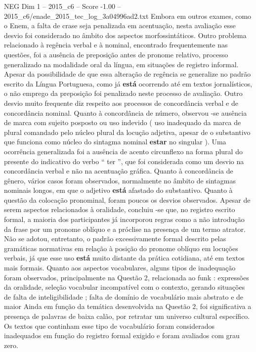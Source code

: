 \begin{textsample}{NEG Dim 1 – 2015\_c6 – Score -1.00 – 2015\_c6/enade\_2015\_tec\_log\_3a04996ad2.txt}
Embora em outros exames, como o Enem, a falta de crase seja penalizada em acentuação, nesta avaliação esse desvio foi considerado no âmbito dos aspectos morfossintáticos.
Outro problema relacionado à regência verbal e à nominal, encontrado frequentemente nas questões, foi a ausência de preposição antes de pronome relativo, processo generalizado na modalidade oral da língua, em situações de registro informal.
Apesar da possibilidade de que essa alteração de regência se generalize no padrão escrito da Língua Portuguesa, como já \textbf{está} ocorrendo até em textos jornalísticos, o não emprego da preposição foi penalizado neste processo de avaliação.
Outro desvio muito frequente diz respeito aos processos de concordância verbal e de concordância nominal.
Quanto à concordância de número, observou -se ausência de marca com sujeito posposto ou uso indevido ( uso inadequado da marca de plural comandado pelo núcleo plural da locução adjetiva, apesar de o substantivo que funciona como núcleo do sintagma nominal \textbf{estar} no singular ).
Uma ocorrência generalizada foi a ausência de acento circunflexo na forma plural do presente do indicativo do verbo “ ter ”, que foi considerada como um desvio na concordância verbal e não na acentuação gráfica.
Quanto à concordância de gênero, vários casos foram observados, normalmente no âmbito de sintagmas nominais longos, em que o adjetivo \textbf{está} afastado do substantivo.
Quanto à questão da colocação pronominal, foram poucos os desvios observados.
Apesar de serem aspectos relacionados à oralidade, concluiu -se que, no registro escrito formal, a maioria dos participantes já incorporou regras como a não introdução da frase por um pronome oblíquo e a próclise na presença de um termo atrator.
Não se adotou, entretanto, o padrão excessivamente formal descrito pelas gramáticas normativas em relação à posição do pronome oblíquo em locuções verbais, já que esse uso \textbf{está} muito distante da prática cotidiana, até em textos mais formais.
Quanto aos aspectos vocabulares, alguns tipos de inadequação foram observados, principalmente na Questão 2, relacionada ao funk : expressões da oralidade, seleção vocabular incompatível com o contexto, gerando situações de falta de inteligibilidade ; falta de domínio de vocabulário mais abstrato e de maior Ainda em função da temática desenvolvida na Questão 2, foi significativa a presença de palavras de baixa calão, por retratar um universo cultural específico.
Os textos que continham esse tipo de vocabulário foram considerados inadequados em função do registro formal exigido e foram avaliados com grau zero.

\end{textsample}
